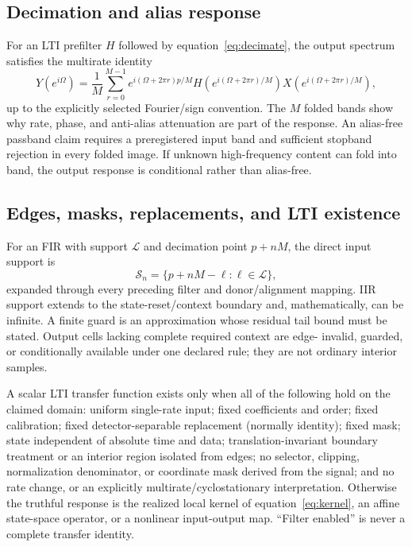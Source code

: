 \documentclass[11pt]{article}
\begin{document}
\subsection{Decimation and alias response}

For an LTI prefilter $H$ followed by equation~\eqref{eq:decimate}, the output
spectrum satisfies the multirate identity
\begin{equation}
 Y(e^{i\Omega})=\frac{1}{M}\sum_{r=0}^{M-1}
 e^{i(\Omega+2\pi r)p/M}
 H\!\left(e^{i(\Omega+2\pi r)/M}\right)
 X\!\left(e^{i(\Omega+2\pi r)/M}\right),
 \tag{RTC-27}\label{eq:alias}
\end{equation}
up to the explicitly selected Fourier/sign convention.  The $M$ folded bands
show why rate, phase, and anti-alias attenuation are part of the response.
An alias-free passband claim requires a preregistered input band and sufficient
stopband rejection in every folded image.  If unknown high-frequency content
can fold into band, the output response is conditional rather than alias-free.

\subsection{Edges, masks, replacements, and LTI existence}

For an FIR with support $\mathcal L$ and decimation point $p+nM$, the direct
input support is
\begin{equation}
 \mathcal S_{n}=\{p+nM-\ell:\ell\in\mathcal L\},
 \tag{RTC-28}\label{eq:support}
\end{equation}
expanded through every preceding filter and donor/alignment mapping.  IIR
support extends to the state-reset/context boundary and, mathematically, can
be infinite.  A finite guard is an approximation whose residual tail bound
must be stated.  Output cells lacking complete required context are edge-
invalid, guarded, or conditionally available under one declared rule; they are
not ordinary interior samples.

A scalar LTI transfer function exists only when all of the following hold on
the claimed domain: uniform single-rate input; fixed coefficients and order;
fixed calibration; fixed detector-separable replacement (normally identity);
fixed mask; state independent of absolute time and data; translation-invariant
boundary treatment or an interior region isolated from edges; no selector,
clipping, normalization denominator, or coordinate mask derived from the
signal; and no rate change, or an explicitly multirate/cyclostationary
interpretation.  Otherwise the truthful response is the realized local kernel
of equation~\eqref{eq:kernel}, an affine state-space operator, or a nonlinear
input-output map.  ``Filter enabled'' is never a complete transfer identity.
\end{document}
